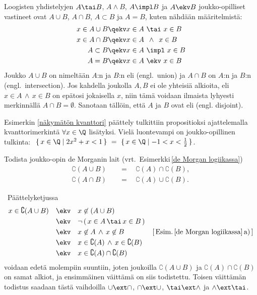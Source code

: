 Loogisten yhdistelyjen $A \tai B$, $A \wedge B$, $A \impl B$ ja $A \ekv B$ joukko-opilliset
vastineet ovat $A \cup B$, $A \cap B$, $A \subset B$ ja $A=B$, kuten nähdään määritelmistä:
\begin{align*}
x\in A \cup B   &\qekv x \in A\ \tai\ x \in B  \\
x\in A \cap B   &\qekv x \in A\,\ \wedge\,\ x \in B  \\
A \subset B     &\qekv x \in A\ \impl\ x \in B \\
A = B           &\qekv x \in A\ \ekv\ x \in B
\end{align*}
Joukko $A \cup B$ on nimeltään $A$:n ja $B$:n 
 eli  (engl.\ union)
ja $A \cap B$ on $A$:n ja $B$:n 
%
 (engl.\ intersection). Jos kahdella joukolla
$A,B$ ei ole yhteisiä alkioita, eli $x \in A\,\wedge\,x \in B$ on epätosi jokaisella $x$, niin 
tämä voidaan ilmaista lyhyesti merkinnällä $A \cap B = \emptyset$. Sanotaan tällöin, että $A$ ja
$B$ ovat  eli 
%
 (engl. disjoint).
\begin{Exa} Esimerkin \ref{näkymätön kvanttori} päättely tulkittiin propositioksi ajattelemalla
kvanttorimerkintä $\forall x\in\Q$ lisätyksi. Vielä luontevampi on joukko-opillinen tulkinta:
$\ \{\,x\in\Q \mid 2x^2+x<1\,\}\ =\ \{\,x\in\Q \mid -1<x<\tfrac{1}{2}\,\}$. \loppu
\end{Exa}
\begin{Exa} Todista joukko-opin de Morganin lait (vrt.\ Esimerkki\,\ref{de Morgan logiikassa})
\begin{align*}
\complement(A \cup B) \quad &= \quad \complement(A) \cap \complement(B), \\
\complement(A \cap B) \quad &= \quad \complement(A) \cup \complement(B).
\end{align*}
\end{Exa}
\ratk \ Päättelyketjussa
\begin{align*}
x \in \complement(A \cup B) \quad &\ekv \quad x \not\in (A \cup B) \\
                                  &\ekv \quad \neg\,(\,x \in A\,\tai\,x \in B\,) \\
                                  &\ekv \quad x \not\in A\,\wedge\,x\not\in B \qquad\qquad 
                                         \text{[\,Esim.\,\ref{de Morgan logiikassa}\,a)\,]} \\
                                  &\ekv \quad x\in\complement(A)\,\wedge\,x\in\complement(B) \\
                                  &\ekv \quad x\in\complement(A)\cap\complement(B)
\end{align*}
voidaan edetä molempiin suuntiin, joten joukoilla $\complement(A \cup B)$ ja 
$\complement(A) \cap \complement(B)$ on samat alkiot, ja ensimmäinen väittämä on siis 
todistettu. Toisen väittämän todistus saadaan tästä vaihdoilla $\cup \ext \cap$, 
$\cap \ext\cup$, $\tai \ext \wedge$ ja $\wedge \ext \tai$. \loppu 

